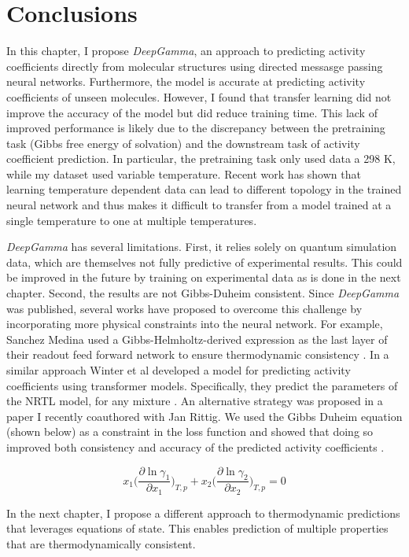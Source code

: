\section{Conclusions}

In this chapter, I propose \textit{DeepGamma}, an approach to predicting activity coefficients directly from molecular structures using directed messasge passing neural networks. Furthermore, the model is accurate at predicting activity coefficients of unseen molecules. However, I found that transfer learning did not improve the accuracy of the model but did reduce training time. This lack of improved performance is likely due to the discrepancy between the pretraining task (Gibbs free energy of solvation) and the downstream task of activity coefficient prediction. In particular, the pretraining task only used data a 298 K, while my dataset used variable temperature. Recent work \cite{Lansford2023} has shown that learning temperature dependent data can lead to different topology in the trained neural network and thus makes it difficult to transfer from a model trained at a single temperature to one at multiple temperatures.

\textit{DeepGamma} has several limitations. First,  it relies solely on quantum simulation data, which are themselves not fully predictive of experimental results. This could be improved in the future by training on experimental data as is done in the next chapter. Second, the results are not Gibbs-Duheim  consistent. Since \textit{DeepGamma} was published, several works have proposed to overcome this challenge by incorporating more physical constraints into the neural network. For example, Sanchez Medina used  a Gibbs-Helmholtz-derived expression as the last layer of their readout feed forward network to ensure thermodynamic consistency \cite{SanchezMedina2023b}. In a similar approach Winter et al developed a model for predicting activity coefficients using transformer models. Specifically, they predict the parameters of the NRTL model, for any mixture \cite{Winter2022}. An alternative strategy was proposed in a paper I recently coauthored with Jan Rittig. We used the Gibbs Duheim equation (shown below) as a constraint in the loss function and showed that doing so improved both consistency and accuracy of the predicted activity coefficients \cite{Rittig2023b}.

\begin{equation}
    x_1 \biggl (\frac{\partial \ln \gamma_1}{\partial x_1}\biggr)_{T,p} + x_2 \biggl (\frac{\partial \ln \gamma_2}{\partial x_2}\biggr)_{T,p} = 0
\end{equation}

In the next chapter, I propose a different approach to thermodynamic predictions that leverages equations of state. This enables prediction of multiple properties that are thermodynamically consistent.

